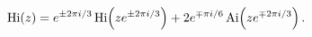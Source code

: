 \[\mathop{\mathrm{Hi}\/}\nolimits\!\left(z\right)=e^{\pm 2\pi i/3}\mathop{%
\mathrm{Hi}\/}\nolimits\!\left(ze^{\pm 2\pi i/3}\right)+2e^{\mp\pi i/6}\mathop%
{\mathrm{Ai}\/}\nolimits\!\left(ze^{\mp 2\pi i/3}\right).\]